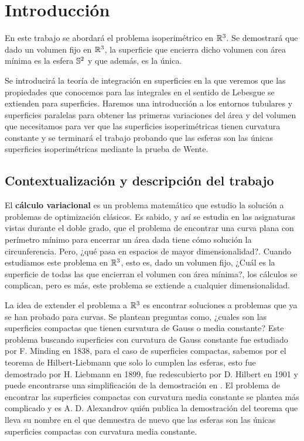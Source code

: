 \section{Introducción}

En este trabajo se abordará el problema isoperimétrico en $\mathbb{R}^3$. Se demostrará que dado un volumen fijo en $\mathbb{R}^3$, la superficie que encierra dicho volumen con área mínima es la esfera $\mathbb{S}^2$ y que además, es la única.

Se introducirá la teoría de integración en superficies en la que veremos que las propiedades que conocemos para las integrales en el sentido de Lebesgue se extienden para superficies. Haremos una introducción a los entornos tubulares y superficies paralelas para obtener las primeras variaciones del área y del volumen que necesitamos para ver que las superficies isoperimétricas tienen curvatura constante y se terminará el trabajo probando que las esferas son las únicas superficies isoperimétricas mediante la prueba de Wente.

\subsection{Contextualización y descripción del trabajo}

El \textbf{cálculo variacional} es un problema matemático que estudio la solución a problemas de optimización clásicos. Es sabido, y así se estudia en las asignaturas vistas durante el doble grado, que el problema de encontrar una curva plana con perímetro mínimo para encerrar un área dada tiene cómo solución la circunferencia. Pero, ¿qué pasa en espacios de mayor dimensionalidad?. Cuando estudiamos este problema en $\mathbb{R}^3$, esto es, dado un volumen fijo, ¿Cuál es la superficie de todas las que encierran el volumen con área mínima?, los cálculos se complican, pero es más, este problema se extiende a cualquier dimensionalidad.

La idea de extender el problema a $\mathbb{R}^3$ es encontrar soluciones a problemas que ya se han probado para curvas. Se plantean preguntas como, ¿cuales son las superficies compactas que tienen curvatura de Gauss o media constante? Este problema buscando superficies con curvatura de Gauss constante fue estudiado por F. Minding en 1838, para el caso de superficies compactas, sabemos por el teorema de Hilbert-Liebmann que solo lo cumplen las esferas, esto fue demostrado por H. Liebmann en 1899, fue redescubierto por D. Hilbert en 1901 y puede encontrarse una simplificación de la demostración en \cite{montielrosbook}. El problema de encontrar las superficies compactas con curvatura media constante se plantea más complicado y es A. D. Alexandrov quién publica la demostración del teorema que lleva su nombre en el que demuestra de nuevo que las esferas son las únicas superficies compactas con curvatura media constante.

